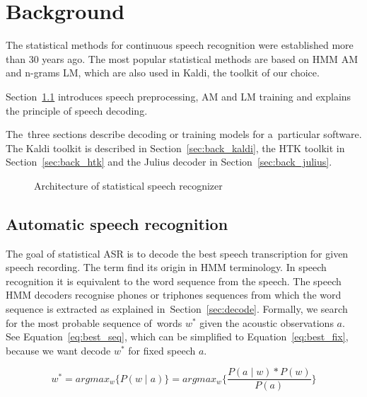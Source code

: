 \chapter{Background}
\label{cha:background}

The statistical methods for continuous speech recognition were established more than 30 years ago. 
The most popular statistical methods are based on \ac{HMM} \acl{AM} and n-grams \ac{LM}, which are also used in Kaldi, the toolkit of our choice.

Section~\ref{sec:back_asr} introduces speech preprocessing, \ac{AM} and \ac{LM} training and explains the principle of speech decoding.

The~three sections describe decoding or training models for a~particular software.
The Kaldi toolkit is described in Section~\ref{sec:back_kaldi}, the \ac{HTK} toolkit in Section~\ref{sec:back_htk} and the Julius decoder in Section~\ref{sec:back_julius}.

\begin{figure}[!htp]
    \begin{center}
    
    \caption{Architecture of statistical speech recognizer\cite{ney1990acoustic}}
    \label{fig:components} 
    \end{center}
\end{figure}

\section{Automatic speech recognition}
\label{sec:back_asr}

The goal of statistical \ac{ASR} is to decode the best speech transcription for given speech recording.
The term  find its origin in \acs{HMM} terminology. 
In speech recognition it is equivalent to  the word sequence from the speech. 
The speech \ac{HMM} decoders recognise phones or triphones sequences from which the word sequence is extracted as explained in~Section~\ref{sec:decode}.
Formally, we search for the most probable sequence of~words $w^*$ given the acoustic observations $a$.
See Equation~\ref{eq:best_seq}, which can be simplified to Equation~\ref{eq:best_fix}, because we want decode $w^*$ for fixed speech $a$.

\begin{equation}\label{eq:best_seq}
    w^* = argmax_{w}\{P(w \mid a)\} = argmax_{w}\{\frac{P(a \mid w) * P(w)}{P(a)}\}
\end{equation}

